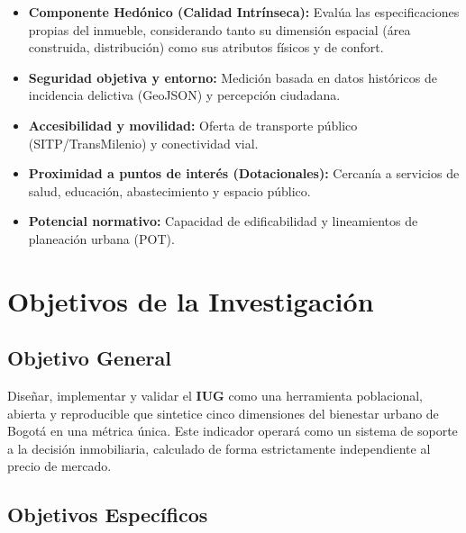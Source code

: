 \documentclass[12pt, a4paper, twoside, openright]{report}
\theoremstyle{plain}
\theoremstyle{definition}
\newcommand{\IUG}{IUG}             %
\begin{document}
\begin{itemize}

    \item \textbf{Componente Hedónico (Calidad Intrínseca):} Evalúa las especificaciones propias del inmueble, considerando tanto su dimensión espacial (área construida, distribución) como sus atributos físicos y de confort.

    \item \textbf{Seguridad objetiva y entorno:} Medición basada en datos históricos de incidencia delictiva (GeoJSON) y percepción ciudadana.

    \item \textbf{Accesibilidad y movilidad:} Oferta de transporte público (SITP/TransMilenio) y conectividad vial.

    \item \textbf{Proximidad a puntos de interés (Dotacionales):} Cercanía a servicios de salud, educación, abastecimiento y espacio público.

    \item \textbf{Potencial normativo:} Capacidad de edificabilidad y lineamientos de planeación urbana (POT).

\end{itemize}


\section{Objetivos de la Investigación}
\label{sec:objetivos}

\subsection{Objetivo General}

Diseñar, implementar y validar el \textbf{\IUG} como una herramienta poblacional, abierta y reproducible que sintetice cinco dimensiones del bienestar urbano de Bogotá en una métrica única. Este indicador operará como un sistema de soporte a la decisión inmobiliaria, calculado de forma estrictamente independiente al precio de mercado.

\subsection{Objetivos Específicos}
\end{document}
